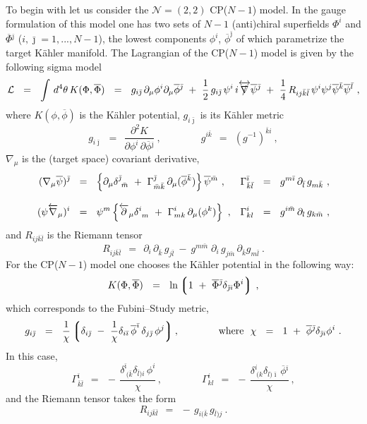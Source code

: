 \documentclass[12pt]{article}
\newcommand{\ntwot}{${\mathcal N}= \left(2,2\right) $ }
\newcommand{\p}{\partial}
\newcommand{\ov}{\overline}
\newcommand{\mc}[1]{\mathcal{#1}}
\newcommand{\lgr}{\left\lgroup}
\newcommand{\rgr}{\right\rgroup}
\def\slashed#1{\setbox0=\hbox{$#1$}             %
   \dimen0=\wd0                                 %
   \setbox1=\hbox{/} \dimen1=\wd1               %
   \ifdim\dimen0>\dimen1                        %
      \rlap{\hbox to \dimen0{\hfil/\hfil}}      %
      #1                                        %
   \else                                        %
      \rlap{\hbox to \dimen1{\hfil$#1$\hfil}}   %
      /                                         %
   \fi}                                        %
\newcommand{\bi}{{\bar \imath}}
\newcommand{\bj}{{\bar \jmath}}
\newcommand{\bk}{{\bar k}}
\newcommand{\bl}{{\bar l}}
\newcommand{\bm}{{\bar m}}
\begin{document}
To begin with let us consider the \ntwot CP($N-1$) model.
In the gauge formulation of this model one has two sets of $ N - 1 $ (anti)chiral 
	superfields $ \Phi^i $ and $ \ov{\Phi}{}^\bj $ ($ i, \bj = 1,..., N-1 $), 
	the lowest components $ \phi^i $, $ \ov{\phi}^\bj $ of which parametrize the target K\"{a}hler
	manifold.
The Lagrangian of the CP($N-1$) model is given by the following sigma model
\[
	\mc{L}
	  ~~=~~ \int\, d^4\theta\, K(\Phi,\ov{\Phi}) ~~=~~ g_{i\bj}\,\p_\mu \phi^i \p_\mu\ov{\phi}{}^\bj
		~+~ \frac{1}{2}\, g_{i\bj}\, \psi^i\, i\overleftrightarrow{\slashed{\nabla}} \ov{\psi}{}^\bj 
		~+~ \frac{1}{4}\, R_{ij\bk\bl}\, \psi^i\psi^j \ov{\psi}{}^\bk \ov{\psi}{}^\bl~,
\]
	where $ K(\phi,\ov{\phi}) $ is the K\"ahler potential, 
	$ g_{i\bj} $ is its K\"ahler metric
\[
	g_{i\bj} ~~=~~ \frac{\p^2 K}{\p\phi^i\,{\p\ov{\phi}{}^\bj}}~,
	\qquad\qquad
	g^{i\bk} ~~=~~ \left(g^{-1}\right)^{\bk i}~,
\]
	$ \nabla_\mu $ is  the (target space) covariant derivative,
\begin{align}
% 
\notag
	(\nabla_\mu \ov{\psi})^\bj & ~~=~~ \left\{ \p_\mu \delta^\bj_{\ \bm} ~+~
						\Gamma_{\bm\bk}^\bj\, \p_\mu(\ov{\phi}{}^\bk) \right\} \ov{\psi}{}^\bm~,
	& \Gamma^\bi_{\bk\bl} & ~~=~~ g^{m\bi}\,\p_\bl\, g_{m\bk}~,
	\\[3mm]
%
\label{covd}
	(\psi \overleftarrow{\nabla}{}_\mu)^i & ~~=~~ 
			\psi^m \left\{ \overleftarrow{\p}{}_\mu\delta^i_{\ m} ~+~
						\Gamma^i_{mk}\, \p_\mu(\phi^k) \right\}~,
	& \Gamma^i_{kl} & ~~=~~ g^{i\bm}\, \p_l\, g_{k\bm}~,
\end{align}
	and $ R_{ij\bk\bl} $ is the Riemann tensor 
\[
	R_{ij\bk\bl} ~~=~~ \p_i\,\p_\bk\, g_{j\bl} ~-~ g^{m\bm}\; \p_i\, g_{j\bm}\, \p_\bk g_{m\bl}~.
\]
	For the CP($N-1$) model one chooses the K\"ahler potential in the following way:
\[
	K(\Phi, \ov{\Phi}) ~~=~~ \ln \lgr 1 ~+~ \ov{\Phi}{}^\bj \delta_{\bj i} \Phi^i \rgr \,,
\]
	which corresponds to the Fubini--Study metric,
\[
	g_{i\bj} ~~=~~ \frac{1}{\chi}\lgr  \delta_{i\bj} ~-~ \frac{1}{\chi}
				  \delta_{i\bi}\,\ov{\phi}^\bi\, \delta_{j\bj}\,\phi^j \rgr,
	\qquad\qquad \text{where~~}
	\chi ~~=~~ 1 ~+~ \ov{\phi}{}^\bj \delta_{\bj i} \phi^i~.
\]
	In this case,
\[
	\Gamma^\bi_{\bk\bl} ~~=~~ -\, \frac{\delta^\bi_{\ (\bk} \delta_{\bl) i}\, \phi^i}{\chi}\,,  
	\qquad\qquad 
	\Gamma^i_{kl} ~~=~~ -\, \frac{\delta^i_{\ (k} \delta_{l)\bi}\,\ov{\phi}{}^\bi}{\chi}\,,
\]
	and the Riemann tensor takes the form
\[
	R_{ij\bk\bl} ~~=~~ -\,g_{i(\bk}\,g_{\bl)j}~.
\]
	
\end{document}
